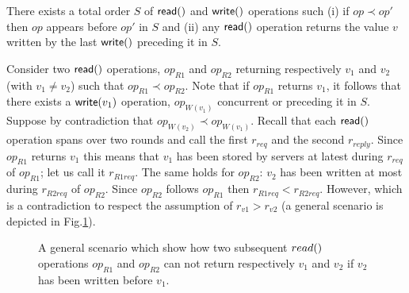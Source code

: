 \begin{theorem}[Ordering]\label{t:ordering} There exists a total order $S$ of ${\sf read}()$ and ${\sf write}()$ operations such (i) if $op \prec op'$ then $op$ appears before $op'$ in $S$ and (ii) any ${\sf read}()$ operation returns the value $v$ written by the last ${\sf write}()$ preceding it in $S$.
\end{theorem}

\begin{proofL}
	Consider two ${\sf read}()$ operations, $op_{R1}$ and $op_{R2}$ returning respectively $v_1$ and $v_2$ (with $v_1 \neq v_2$) such that $op_{R1} \prec op_{R2}$.
	Note that if $op_{R1}$ returns $v_1$, it follows that there exists a ${\sf write}(v_1)$ operation,  $op_{W(v_1)}$ concurrent or preceding it in $S$. 
	Suppose by contradiction that $op_{W(v_2)} \prec op_{W(v_1)}$. Recall that each ${\sf read}()$ operation spans over two rounds and call the first $r_{req}$ and the second $r_{reply}$.
Since $op_{R1}$ returns $v_1$ this means that $v_1$ has been stored by servers at latest during $r_{req}$ of $op_{R1}$; let us call it $r_{R1req}$. The same holds for $op_{R2}$: $v_2$ has been written at most during $r_{R2req}$ of $op_{R2}$. 
	Since $op_{R2}$ follows $op_{R1}$ then $r_{R1req}<r_{R2req}$. However, which is a contradiction to respect the assumption of $r_{v1}>r_{v2}$ (a general scenario is depicted in Fig.\ref{fig:scenarioOrdering}).
	\renewcommand{\toto}{t:ordering}
\end{proofL}


\begin{figure}
	\caption{A general scenario which show how two subsequent ${\sc read}()$ operations $op_{R1}$ and $op_{R2}$ can not return respectively $v_1$ and $v_2$ if $v_2$ has been written before $v_1$.}
	\label{fig:scenarioOrdering}
\end{figure}

